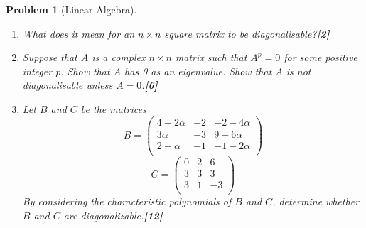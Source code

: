 \documentclass[a4paper]{article}
\theoremstyle{new}
\newtheorem{qns}{Problem}[section]
\begin{document}
\newpage
\begin{qns}[Linear Algebra]\leavevmode
\begin{enumerate}[label=(\alph*)]
\item What does it mean for an $n\times n$ square matrix to be diagonalisable?\hfill\textbf{[2]}
\item Suppose that $A$ is a complex $n\times n$ matrix such that $A^p = 0$ for some positive integer $p$. Show that $A$ has 0 as an eigenvalue. Show that $A$ is not diagonalisable unless $A = 0$.\hfill\textbf{[6]}
\item Let $B$ and $C$ be the matrices
$$B=\begin{pmatrix}4+2\alpha&-2&-2-4\alpha\\3\alpha&-3&9-6\alpha\\2+\alpha&-1&-1-2\alpha\\\end{pmatrix}$$
$$C=\begin{pmatrix}0&2&6\\3&3&3\\3&1&-3\\\end{pmatrix}$$
By considering the characteristic polynomials of $B$ and $C$, determine whether $B$ and $C$ are diagonalizable.\hfill\textbf{[12]}
\end{enumerate}
\end{qns}
\end{document}

